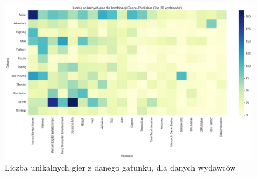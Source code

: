\documentclass[11pt]{article}
\begin{document}
\begin{figure}[H]
    \centering
    \includegraphics[width=0.9\linewidth]{figures/Genre-Publisher}
    \caption{Liczba unikalnych gier z danego gatunku, dla danych wydawców}
    \label{fig:wydawcy0}
\end{figure}
\end{document}
